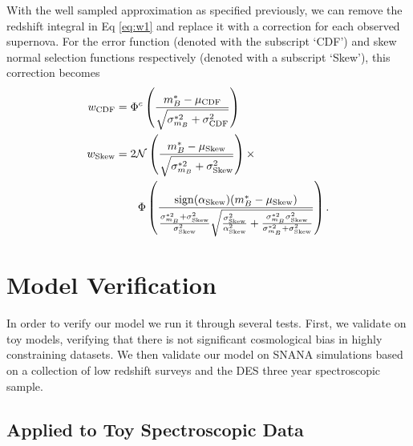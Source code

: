\documentclass[a4paper,fleqn,usenatbib]{mnras}
\begin{document}
With the well sampled approximation as specified previously, we can remove the redshift integral in Eq \eqref{eq:w1} and replace it with a correction for each observed supernova. For the error function (denoted with the subscript `CDF') and skew normal selection functions respectively (denoted with a subscript `Skew'), this correction becomes
\begin{align}
w_{\rm CDF} &= \Phi^c\left(  \frac{m^*_B - \mu_{\rm CDF}}{\sqrt{\sigma^{*2}_{m_B} + \sigma_{\rm CDF}^2}}  \right) \label{eq:seldes}\\
w_{\rm Skew} &= 2\mathcal{N}\left( \frac{m_B^* - \mu_{\rm Skew}}{\sqrt{\sigma^{*2}_{m_B} + \sigma_{\rm Skew}^2}}\right) \times \notag\\
&\quad\quad \Phi\left(  \frac{{\rm sign}(\alpha_{\rm Skew})(m_B^* - \mu_{\rm Skew})}{\frac{\sigma_{m_B}^{*2} + \sigma^2_{\rm Skew}}{\sigma^2_{\rm Skew}} \sqrt{\frac{\sigma^2_{\rm Skew}}{\alpha^2_{\rm Skew}} + \frac{\sigma_{m_B}^{*2} \sigma^2_{\rm Skew}}{\sigma_{m_B}^{*2} + \sigma^2_{\rm Skew}}} }\right). \label{eq:sellowz}
\end{align}









\section{Model Verification}
\label{sec:verification}

In order to verify our model we run it through several tests. First, we validate on toy models, verifying that there is not significant cosmological bias in highly constraining datasets. We then validate our model on SNANA simulations based on a collection of low redshift surveys and the DES three year spectroscopic sample.

\subsection{Applied to Toy Spectroscopic Data}
\label{sec:toy}
\end{document}
